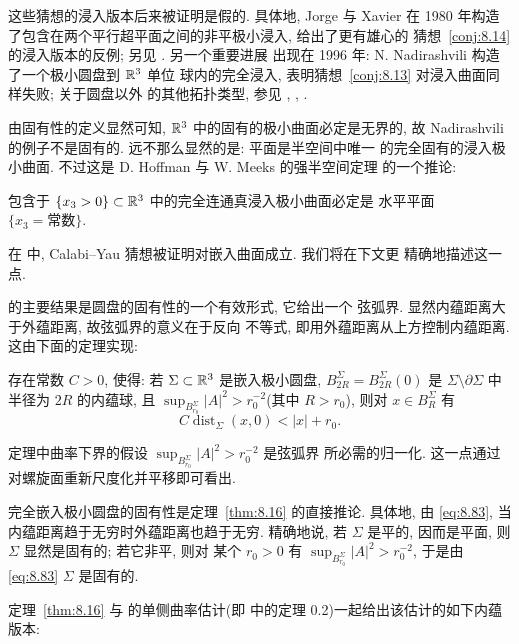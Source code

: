 这些猜想的浸入版本后来被证明是假的. 具体地, Jorge 与 Xavier \cite{JXa2} 在
1980 年构造了包含在两个平行超平面之间的非平极小浸入, 给出了更有雄心的
猜想~\ref{conj:8.14} 的浸入版本的反例; 另见 \cite{RoTo}. 另一个重要进展
出现在 1996 年: N. Nadirashvili \cite{Na1} 构造了一个极小圆盘到 $\mathbb{R}^3$ 单位
球内的完全浸入, 表明猜想~\ref{conj:8.13} 对浸入曲面同样失败; 关于圆盘以外
的其他拓扑类型, 参见 \cite{MaMo1}, \cite{LMaMo1}, \cite{LMaMo2}.

由固有性的定义显然可知, $\mathbb{R}^3$ 中的固有的极小曲面必定是无界的, 故
Nadirashvili 的例子不是固有的. 远不那么显然的是: 平面是半空间中唯一
的完全固有的浸入极小曲面. 不过这是 D. Hoffman 与 W. Meeks 的强半空间定理
的一个推论:

\begin{theorem}
\label{thm:8.15}
包含于 $\{x_3>0\}\subset\mathbb{R}^3$ 中的完全连通真浸入极小曲面必定是
水平平面 $\{x_3=\text{常数}\}$.
\end{theorem}

在 \cite{CM24} 中, Calabi--Yau 猜想被证明对嵌入曲面成立. 我们将在下文更
精确地描述这一点.

\cite{CM24} 的主要结果是圆盘的固有性的一个有效形式, 它给出一个
弦弧界. 显然内蕴距离大于外蕴距离, 故弦弧界的意义在于反向
不等式, 即用外蕴距离从上方控制内蕴距离. 这由下面的定理实现:

\begin{theorem}
\label{thm:8.16}
存在常数 $C>0$, 使得: 若 $\Sigma\subset\mathbb{R}^3$ 是嵌入极小圆盘,
$B_{2R}^\Sigma=B_{2R}^\Sigma(0)$ 是 $\Sigma\setminus\partial\Sigma$ 中半径为
$2R$ 的内蕴球, 且 $\sup_{B_{r_0}^\Sigma}|A|^2>r_0^{-2}$(其中 $R>r_0$), 则对
$x\in B_R^\Sigma$ 有
\begin{equation}
C\operatorname{dist}_\Sigma(x,0)<|x|+r_0.
\label{eq:8.83}
\end{equation}
\end{theorem}

定理中曲率下界的假设 $\sup_{B_{r_0}^\Sigma}|A|^2>r_0^{-2}$ 是弦弧界
所必需的归一化. 这一点通过对螺旋面重新尺度化并平移即可看出.

完全嵌入极小圆盘的固有性是定理~\ref{thm:8.16} 的直接推论. 具体地, 由
\eqref{eq:8.83}, 当内蕴距离趋于无穷时外蕴距离也趋于无穷. 精确地说, 若
$\Sigma$ 是平的, 因而是平面, 则 $\Sigma$ 显然是固有的; 若它非平, 则对
某个 $r_0>0$ 有 $\sup_{B_{r_0}^\Sigma}|A|^2>r_0^{-2}$, 于是由 \eqref{eq:8.83}
$\Sigma$ 是固有的.

定理~\ref{thm:8.16} 与 \cite{CM6} 的单侧曲率估计(即 \cite{CM6} 中的定理
0.2)一起给出该估计的如下内蕴版本:

